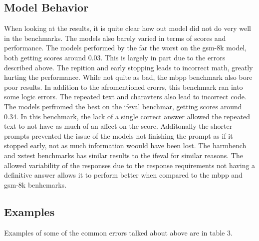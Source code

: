 \documentclass[11pt]{article}
\begin{document}
\subsection{Model Behavior}
When looking at the results, it is quite clear how out model did not do very well in the benchmarks. The models also barely varied in terms of scores and performance. 
The models performed by the far the worst on the gsm-8k model, both getting scores around 0.03. This is largely in part due to the errors described above. The repition and early stopping leads to incorrect math, greatly hurting the performance. 
While not quite as bad, the mbpp benchmark also bore poor results. In addition to the afromentioned erorrs, this benchmark ran into some logic errors. The repeated text and charavters also lead to incorrect code. 
The models perfromed the best on the ifeval benchmar, getting scores around 0.34. In this benchmark, the lack of a single correct answer allowed the repeated text to not have as much of an affect on the score. Additonally the shorter prompts prevented the issue of the models not finishing the prompt as if it stopped early, not as much information woould have been lost.
The harmbench and xstest benchmarks has sinilar results to the ifeval for similar reasons. The allowed variability of the responses due to the response requirements not having a definitive answer allows it to perform better when compared to the mbpp and gsm-8k benhcmarks.
\subsection{Examples}
Examples of some of the common errors talked about above are in table 3.

\begin{table}[h]
\centering
\small
\setlength{\tabcolsep}{4pt}
\renewcommand{\arraystretch}{1.2}
\caption{Examples of common errors across models and benchmarks}
\label{tab3}
\end{table}
\end{document}
